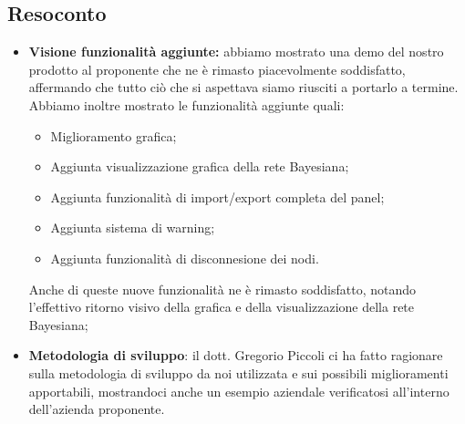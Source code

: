 \subsection{Resoconto}
\begin{itemize}
	\item \textbf{Visione funzionalità aggiunte:} abbiamo mostrato una demo del nostro prodotto al proponente che ne è rimasto piacevolmente soddisfatto, affermando che tutto ciò che si aspettava siamo riusciti a portarlo a termine. Abbiamo inoltre mostrato le funzionalità aggiunte quali:
	\begin{itemize}
		\item Miglioramento grafica;
		\item Aggiunta visualizzazione grafica della rete Bayesiana;
		\item Aggiunta funzionalità di import/export completa del panel;
		\item Aggiunta sistema di warning;
		\item Aggiunta funzionalità di disconnesione dei nodi.
	\end{itemize}
	Anche di queste nuove funzionalità ne è rimasto soddisfatto, notando l'effettivo ritorno visivo della grafica e della visualizzazione della rete Bayesiana;
	\item {\textbf{Metodologia di sviluppo}:
	il dott. Gregorio Piccoli ci ha fatto ragionare sulla metodologia di sviluppo da noi utilizzata e sui possibili miglioramenti apportabili, mostrandoci anche un esempio aziendale verificatosi all'interno dell'azienda proponente.}
\end{itemize}

